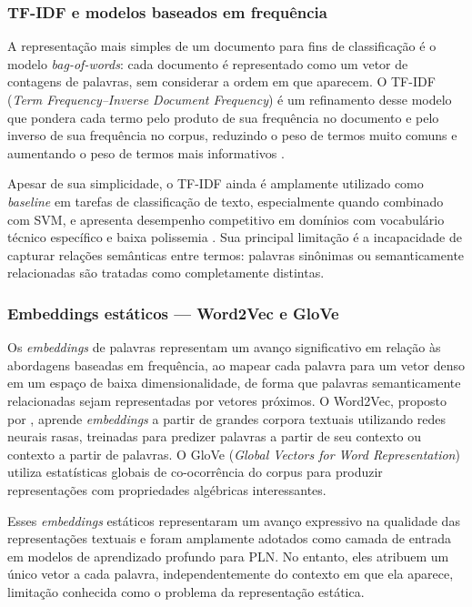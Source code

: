 \documentclass[
    12pt,                %
    openright,           %
    oneside,             %
    a4paper,             %
    english,             %
    brazil               %
]{abntex2}
\begin{document}
\subsubsection{TF-IDF e modelos baseados em frequência}
\label{subsubsec:pln_tfidf}

A representação mais simples de um documento para fins de classificação é o modelo \textit{bag-of-words}: cada documento é representado como um vetor de contagens de palavras, sem considerar a ordem em que aparecem. O TF-IDF (\textit{Term Frequency–Inverse Document Frequency}) é um refinamento desse modelo que pondera cada termo pelo produto de sua frequência no documento e pelo inverso de sua frequência no corpus, reduzindo o peso de termos muito comuns e aumentando o peso de termos mais informativos \cite{razma2026}.

Apesar de sua simplicidade, o TF-IDF ainda é amplamente utilizado como \textit{baseline} em tarefas de classificação de texto, especialmente quando combinado com SVM, e apresenta desempenho competitivo em domínios com vocabulário técnico específico e baixa polissemia \cite{wahba2023}. Sua principal limitação é a incapacidade de capturar relações semânticas entre termos: palavras sinônimas ou semanticamente relacionadas são tratadas como completamente distintas.

\subsubsection{Embeddings estáticos — Word2Vec e GloVe}
\label{subsubsec:pln_embeddings}

Os \textit{embeddings} de palavras representam um avanço significativo em relação às abordagens baseadas em frequência, ao mapear cada palavra para um vetor denso em um espaço de baixa dimensionalidade, de forma que palavras semanticamente relacionadas sejam representadas por vetores próximos. O Word2Vec, proposto por , aprende \textit{embeddings} a partir de grandes corpora textuais utilizando redes neurais rasas, treinadas para predizer palavras a partir de seu contexto ou contexto a partir de palavras. O GloVe (\textit{Global Vectors for Word Representation}) utiliza estatísticas globais de co-ocorrência do corpus para produzir representações com propriedades algébricas interessantes.

Esses \textit{embeddings} estáticos representaram um avanço expressivo na qualidade das representações textuais e foram amplamente adotados como camada de entrada em modelos de aprendizado profundo para PLN. No entanto, eles atribuem um único vetor a cada palavra, independentemente do contexto em que ela aparece, limitação conhecida como o problema da representação estática.
\end{document}
